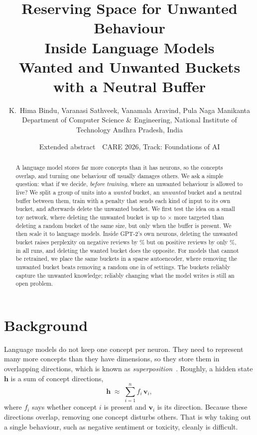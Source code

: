 \documentclass[11pt,a4paper]{article}
\title{\vspace{-1.6em}\textbf{Reserving Space for Unwanted Behaviour\\ Inside Language Models\\[2pt]
\large Wanted and Unwanted Buckets with a Neutral Buffer}}
\author{K.\ Hima Bindu, Varanasi Sathveek, Vanamala Aravind, Pula Naga Manikanta\\[2pt]
\small Department of Computer Science \& Engineering, National Institute of Technology Andhra Pradesh, India}
\date{\small Extended abstract \,\textbullet\, CARE 2026, Track: Foundations of AI}
\newcommand{\h}{\mathbf{h}}
\begin{document}
\maketitle
\vspace{-1.2em}

\begin{abstract}
\noindent
A language model stores far more concepts than it has neurons, so the concepts overlap, and
turning one behaviour off usually damages others. We ask a simple question: what if we decide,
\emph{before training}, where an unwanted behaviour is allowed to live? We split a group of units
into a \emph{wanted} bucket, an \emph{unwanted} bucket and a neutral buffer between them, train with
a penalty that sends each kind of input to its own bucket, and afterwards delete the unwanted bucket.
We first test the idea on a small toy network, where deleting the unwanted bucket is up to
\specMax$\times$ more targeted than deleting a random bucket of the same size, but only when the
buffer is present. We then scale it to language models. Inside GPT-2's own neurons, deleting the
unwanted bucket raises perplexity on negative reviews by \gtBadNeg\% but on positive reviews by only
\gtBadPos\%, in all \gtSeeds{} runs, and deleting the wanted bucket does the opposite. For models that
cannot be retrained, we place the same buckets in a sparse autoencoder, where removing the unwanted
bucket beats removing a random one in \blockPositive{} of \blockTotal{} settings. The buckets reliably
capture the unwanted knowledge; reliably changing what the model writes is still an open problem.
\end{abstract}

\section{Background}

Language models do not keep one concept per neuron. They need to represent many more concepts than
they have dimensions, so they store them in overlapping directions, which is known as
\emph{superposition}~\citep{elhage2022toy}. Roughly, a hidden state $\h$ is a sum of concept directions,
\begin{equation}
  \h \;\approx\; \textstyle\sum_{i=1}^{n} f_i\,\mathbf v_i ,
\end{equation}
where $f_i$ says whether concept $i$ is present and $\mathbf v_i$ is its direction. Because these
directions overlap, removing one concept disturbs others. That is why taking out a single behaviour,
such as negative sentiment or toxicity, cleanly is difficult.
\end{document}

